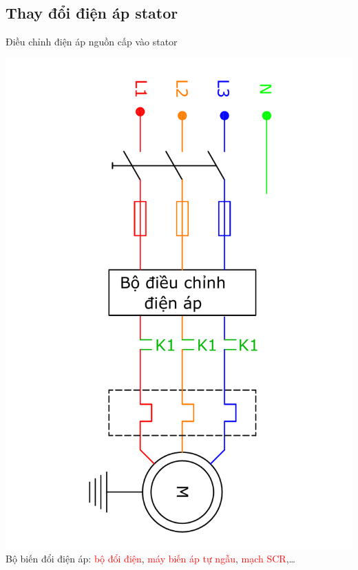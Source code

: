 \documentclass{beamer}
\begin{document}
\subsection{Thay đổi điện áp stator}
\begin{frame}{Điều chỉnh điện áp nguồn cấp vào stator}
	\vspace{-2cm}
	\begin{center}
		\includegraphics[scale=0.4, angle = 90]{../sodomach/dieu-chinh-dien-ap-stator.pdf}
	\vspace{-2cm}
	Bộ biến đổi điện áp: \textcolor{red}{bộ đổi điện}, \textcolor{red}{máy biến áp tự ngẫu}, \textcolor{red}{mạch SCR},\ldots
	\end{center}
\end{frame}
\end{document}
